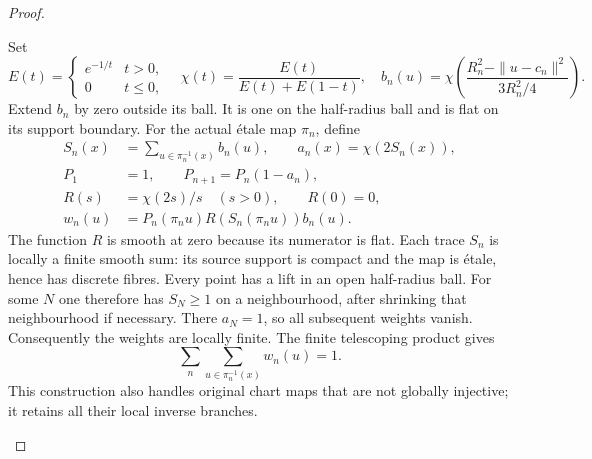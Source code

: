 \begin{proof}
\begin{enumerate}[label=\arabic*.,leftmargin=*]
Set
\[
 E(t)=\begin{cases}e^{-1/t}&t>0,\\0&t\le0,\end{cases}
 \quad \chi(t)=\frac{E(t)}{E(t)+E(1-t)},\quad
 b_n(u)=\chi\!\left(
       \frac{R_n^2-\|u-c_n\|^2}{3R_n^2/4}\right).
\]
Extend $b_n$ by zero outside its ball.  It is one on the half-radius
ball and is flat on its support boundary.  For the actual étale map
$\pi_n$, define
\begin{equation}\label{inv:eq:atlas-weights}
 \begin{aligned}
 S_n(x)&=\sum_{u\in\pi_n^{-1}(x)}b_n(u),\qquad
 a_n(x)=\chi(2S_n(x)),\\
 P_1&=1,\qquad P_{n+1}=P_n(1-a_n),\\
 R(s)&=\chi(2s)/s\quad(s>0),\qquad R(0)=0,\\
 w_n(u)&=P_n(\pi_nu)R(S_n(\pi_nu))b_n(u).
 \end{aligned}
\end{equation}
The function $R$ is smooth at zero because its numerator is flat.
Each trace $S_n$ is locally a finite smooth sum: its source support
is compact and the map is étale, hence has discrete fibres.  Every
point has a lift in an open half-radius ball.  For some $N$ one therefore
has $S_N\ge1$ on a neighbourhood, after shrinking that neighbourhood
if necessary.  There $a_N=1$, so all subsequent weights vanish.
Consequently the weights are locally finite.  The finite telescoping
product gives
\[
 \sum_n\sum_{u\in\pi_n^{-1}(x)}w_n(u)=1.
\]
This construction also handles original chart maps that are not
globally injective; it retains all their local inverse branches.


\end{enumerate}
\end{proof}
